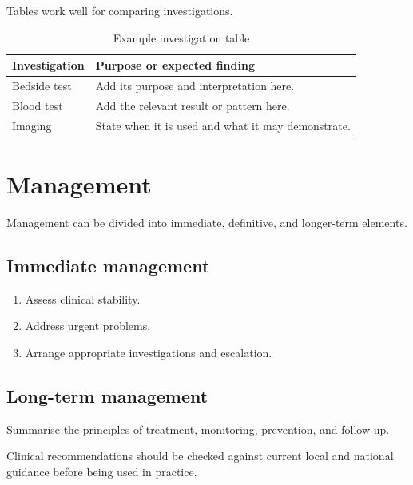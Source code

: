 Tables work well for comparing investigations.

\begin{table}[htbp]
    \centering
    \caption{Example investigation table}
    \label{tab:example-investigations}

    \begin{tabularx}{\textwidth}{@{} l Y @{}}
        \toprule
        \textbf{Investigation} & \textbf{Purpose or expected finding} \\
        \midrule
        Bedside test
            & Add its purpose and interpretation here. \\

        Blood test
            & Add the relevant result or pattern here. \\

        Imaging
            & State when it is used and what it may demonstrate. \\
        \bottomrule
    \end{tabularx}
\end{table}

\section{Management}

Management can be divided into immediate, definitive, and longer-term
elements.

\subsection{Immediate management}

\begin{enumerate}
    \item Assess clinical stability.
    \item Address urgent problems.
    \item Arrange appropriate investigations and escalation.
\end{enumerate}

\subsection{Long-term management}

Summarise the principles of treatment, monitoring, prevention, and
follow-up.

\begin{clinicalnote}
Clinical recommendations should be checked against current local and
national guidance before being used in practice.
\end{clinicalnote}

